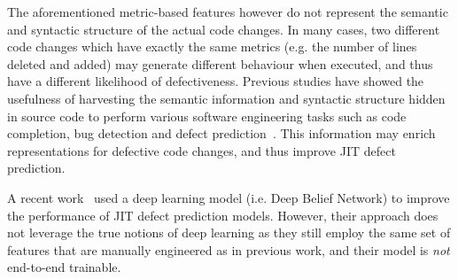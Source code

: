 The aforementioned metric-based features however do not represent the semantic and syntactic structure of the actual code changes. In many cases, two different code changes which have exactly the same metrics (e.g. the number of lines deleted and added) may generate different behaviour when executed, and thus have a different likelihood of defectiveness. Previous studies have showed the usefulness of harvesting the semantic information and syntactic structure hidden in source code to perform various software engineering tasks such as code completion, bug detection and defect prediction~\cite{Wang:2016:ALS,Tu:2014:LS,Nguyen:2015:GSL,Hindle:2012:NS,Li:2005:PAE}. This information may enrich representations for defective code changes, and thus improve JIT defect prediction.

A recent work~\cite{Yang:2015:DLJ}  used a deep learning model (i.e. Deep Belief Network) to improve the performance of JIT defect prediction models. However, their approach does not leverage the true notions of deep learning as they still employ the same set of features that are manually engineered as in previous work, and their model is \emph{not} end-to-end trainable.


